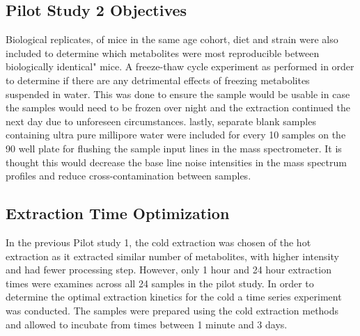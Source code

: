 \documentclass[a4paper,11pt,twoside]{book}
\begin{document}
	\subsection*{Pilot Study 2 Objectives}
	 
	Biological replicates, of mice in the same age cohort, diet and strain were also included to determine which metabolites were most reproducible between biologically identical" mice.  A freeze-thaw cycle experiment as performed in order to determine if there are any detrimental effects of freezing metabolites suspended in water. This was done to ensure the sample would be usable in case the samples would need to be frozen over night and the extraction continued the next day due to unforeseen circumstances. lastly, separate blank samples containing ultra pure millipore water were included for every 10 samples on the 90 well plate for flushing the sample input lines in the mass spectrometer. It is thought this would decrease the base line noise intensities in the mass spectrum profiles and reduce cross-contamination between samples.
	
	\subsection*{Extraction Time Optimization}
	
	In the previous Pilot study 1, the cold extraction was chosen of the hot extraction as it extracted similar number of metabolites, with higher intensity and had fewer processing step. However, only 1 hour and 24 hour extraction times were examines across all 24 samples in the pilot study. In order to determine the optimal extraction kinetics for the cold a time series experiment was conducted. The samples were prepared using the cold extraction methods and allowed to incubate from times between 1 minute and 3 days.
	
\end{document}
